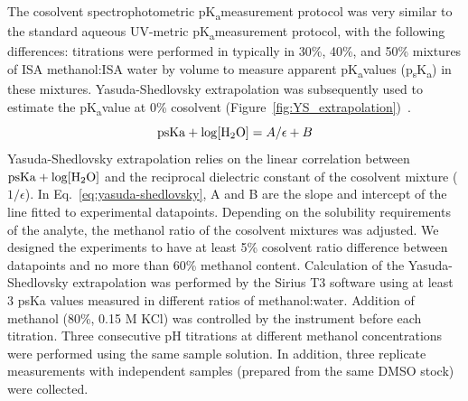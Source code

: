 \documentclass[9pt,lineno]{elife}
\newcommand{\pKa}{pK\textsubscript{a}}
\newcommand{\psKa}{p\textsubscript{s}K\textsubscript{a}}
\begin{document}
The cosolvent spectrophotometric \pKa measurement protocol was very similar to the standard aqueous UV-metric \pKa measurement protocol, with the following differences: 
titrations were performed in typically in 30\%, 40\%, and 50\% mixtures of ISA methanol:ISA water by volume to measure apparent \pKa values (\psKa) in these mixtures. 
Yasuda-Shedlovsky extrapolation was subsequently used to estimate the \pKa value at 0\% cosolvent (Figure~\ref{fig:YS_extrapolation})~\citep{avdeef_ph-metric_1999,doi:10.1021/ac00049a010,TAKACSNOVAK1997235}. 
\begin{equation}
\mathrm{psKa} + \log [\ce{H2O}]=A/\epsilon+B 
\label{eq:yasuda-shedlovsky}
\end{equation}
Yasuda-Shedlovsky extrapolation relies on the linear correlation between $\mathrm{psKa} + \log [\ce{H2O}]$ and the reciprocal dielectric constant of the cosolvent mixture ($1/\epsilon$). 
In Eq.~\ref{eq:yasuda-shedlovsky}, A and B are the slope and intercept of the line fitted to experimental datapoints.  
Depending on the solubility requirements of the analyte, the methanol ratio of the cosolvent mixtures was adjusted. 
We designed the experiments to have at least 5\% cosolvent ratio difference between datapoints and no more than 60\% methanol content. 
Calculation of the Yasuda-Shedlovsky extrapolation was performed by the Sirius T3 software using at least 3 psKa values measured in different ratios of methanol:water.
Addition of methanol (80\%, 0.15 M KCl) was controlled by the instrument before each titration. 
Three consecutive pH titrations at different methanol concentrations were performed using the same sample solution. 
In addition, three replicate measurements with independent samples (prepared from the same DMSO stock) were collected.
\end{document}
